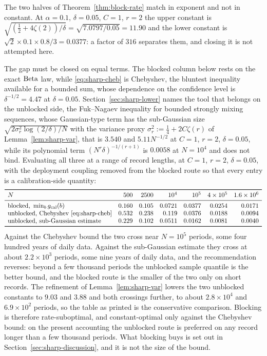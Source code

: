 \documentclass[../../../main.tex]{subfiles}
\begin{document}
\begin{remark}[Constants, and which route a bank should use at $N=500$]\label{rem:sharp-constants}
The two halves of Theorem~\ref{thm:block-rate} match in exponent and not in constant. At $\alpha=0.1$, $\delta=0.05$, $C=1$, $r=2$ the upper constant is $\sqrt{(\tfrac12+4\zeta(2))/\delta}=\sqrt{7.0797/0.05}=11.90$ and the lower constant is $\sqrt2\times0.1\times0.8/3=0.0377$: a factor of $316$ separates them, and closing it is not attempted here.

The gap must be closed on equal terms. The blocked column below rests on the exact $\operatorname{Beta}$ law, while \eqref{eq:sharp-cheb} is Chebyshev, the bluntest inequality available for a bounded sum, whose dependence on the confidence level is $\delta^{-1/2}=4.47$ at $\delta=0.05$. Section~\ref{sec:sharp-lower} names the tool that belongs on the unblocked side, the Fuk--Nagaev inequality for bounded strongly mixing sequences, whose Gaussian-type term has the sub-Gaussian size $\sqrt{2\sigma_r^2\log(2/\delta)/N}$ with the variance proxy $\sigma^2_r:=\tfrac14+2C\zeta(r)$ of Lemma~\ref{lem:sharp-var}, that is $3.540$ and $5.11N^{-1/2}$ at $C=1$, $r=2$, $\delta=0.05$, while its polynomial term $(N^r\delta)^{-1/(r+1)}$ is $0.0058$ at $N=10^4$ and does not bind. Evaluating all three at a range of record lengths, at $C=1$, $r=2$, $\delta=0.05$, with the deployment coupling removed from the blocked route so that every entry is a calibration-side quantity:
\[
\begin{array}{lrrrrrr}
\toprule
N & 500 & 2500 & 10^4 & 10^5 & 4\times10^5 & 1.6\times10^6\\
\midrule
\text{blocked, }\min_bg_{\mathrm{cal}}(b) & 0.160 & 0.105 & 0.0721 & 0.0377 & 0.0254 & 0.0171\\
\text{unblocked, Chebyshev \eqref{eq:sharp-cheb}} & 0.532 & 0.238 & 0.119 & 0.0376 & 0.0188 & 0.0094\\
\text{unblocked, sub-Gaussian estimate} & 0.229 & 0.102 & 0.0511 & 0.0162 & 0.0081 & 0.0040\\
\bottomrule
\end{array}
\]
Against the Chebyshev bound the two cross near $N=10^5$ periods, some four hundred years of daily data. Against the sub-Gaussian estimate they cross at about $2.2\times10^3$ periods, some nine years of daily data, and the recommendation reverses: beyond a few thousand periods the unblocked sample quantile is the better bound, and the blocked route is the smaller of the two only on short records. The refinement of Lemma~\ref{lem:sharp-var} lowers the two unblocked constants to $9.03$ and $3.88$ and both crossings further, to about $2.8\times10^4$ and $6.9\times10^2$ periods, so the table as printed is the conservative comparison. Blocking is therefore rate-suboptimal, and constant-optimal only against the Chebyshev bound: on the present accounting the unblocked route is preferred on any record longer than a few thousand periods. What blocking buys is set out in Section~\ref{sec:sharp-discussion}, and it is not the size of the bound.
\end{remark}
\end{document}
